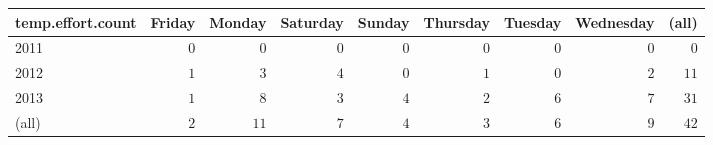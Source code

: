 \begin{table}[!tbp]
\begin{center}
\begin{tabular}{lrrrrrrrr}
\hline\hline
\multicolumn{1}{l}{temp.effort.count}&\multicolumn{1}{c}{Friday}&\multicolumn{1}{c}{Monday}&\multicolumn{1}{c}{Saturday}&\multicolumn{1}{c}{Sunday}&\multicolumn{1}{c}{Thursday}&\multicolumn{1}{c}{Tuesday}&\multicolumn{1}{c}{Wednesday}&\multicolumn{1}{c}{(all)}\tabularnewline
\hline
2011&$0$&$ 0$&$0$&$0$&$0$&$0$&$0$&$ 0$\tabularnewline
2012&$1$&$ 3$&$4$&$0$&$1$&$0$&$2$&$11$\tabularnewline
2013&$1$&$ 8$&$3$&$4$&$2$&$6$&$7$&$31$\tabularnewline
(all)&$2$&$11$&$7$&$4$&$3$&$6$&$9$&$42$\tabularnewline
\hline
\end{tabular}\end{center}

\end{table}
